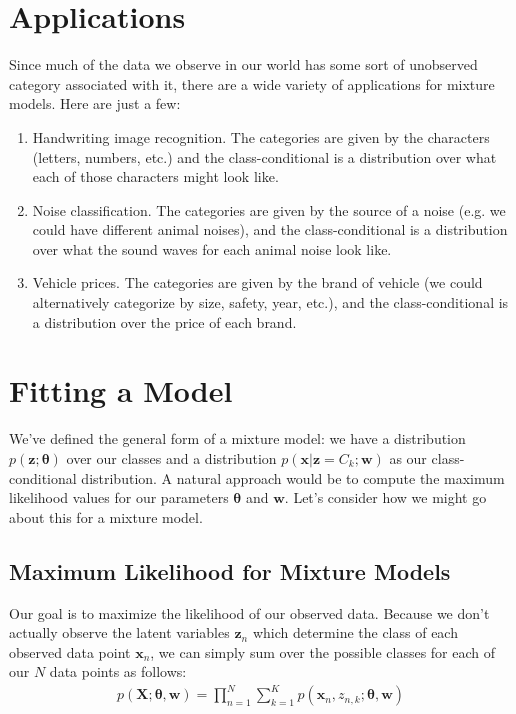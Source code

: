 \section{Applications}
Since much of the data we observe in our world has some sort of unobserved category associated with it, there are a wide variety of applications for mixture models. Here are just a few:
\begin{enumerate}
    \item Handwriting image recognition. The categories are given by the characters (letters, numbers, etc.) and the class-conditional is a distribution over what each of those characters might look like.
    \item Noise classification. The categories are given by the source of a noise (e.g. we could have different animal noises), and the class-conditional is a distribution over what the sound waves for each animal noise look like.
    \item Vehicle prices. The categories are given by the brand of vehicle (we could alternatively categorize by size, safety, year, etc.), and the class-conditional is a distribution over the price of each brand.
\end{enumerate}

\section{Fitting a Model}
We've defined the general form of a mixture model: we have a distribution $p(\textbf{z}; \boldsymbol{\theta})$ over our classes and a distribution $p(\textbf{x}|\textbf{z} = C_k; \textbf{w})$ as our class-conditional distribution. A natural approach would be to compute the maximum likelihood values for our parameters $\boldsymbol{\theta}$ and $\textbf{w}$. Let's consider how we might go about this for a mixture model.

\subsection{Maximum Likelihood for Mixture Models}
Our goal is to maximize the likelihood of our observed data. Because we don't actually observe the latent variables $\textbf{z}_n$ which determine the class of each observed data point $\textbf{x}_n$, we can simply sum over the possible classes for each of our $N$ data points as follows:
\begin{align*}
    p(\textbf{X}; \boldsymbol{\theta}, \textbf{w}) = \prod_{n=1}^{N} \sum_{k=1}^{K} p(\textbf{x}_{n}, z_{n, k}; \boldsymbol{\theta}, \textbf{w})
\end{align*}

